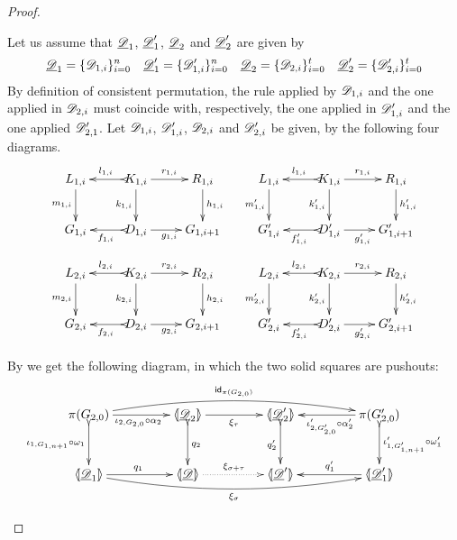 \begin{proof}
\begin{itemize}
Let us assume that $\underline{\mathscr{D}}_1$, $\underline{\mathscr{D}}'_1$, $\underline{\mathscr{D}}_2$ and $\underline{\mathscr{D}}'_2$ are given by
\[\underline{\mathscr{D}}_1=\{\mathscr{D}_{1,i}\}_{i=0}^n \quad \underline{\mathscr{D}}'_1=\{\mathscr{D}'_{1,i}\}_{i=0}^n \quad \underline{\mathscr{D}}_2=\{\mathscr{D}_{2,i}\}_{i=0}^t \quad \underline{\mathscr{D}}_2'=\{\mathscr{D}'_{2,i}\}_{i=0}^t\]
By definition of consistent permutation, the rule applied by $\mathscr{D}_{1,i}$ and the one applied in $\mathscr{D}_{2,i}$  must coincide with, respectively, the one applied in $\mathscr{D}'_{1,i}$ and the one applied $\mathscr{D}'_{2,1}$. Let $\mathscr{D}_{1,i}$, $\mathscr{D}'_{1,i}$, $\mathscr{D}_{2,i}$ and $\mathscr{D}'_{2,i}$ be given, by the following four diagrams. 
\[\xymatrix{L_{1,i} \ar[d]_{m_{1, i}}& K_{1,i} \ar[d]_{k_{1, i}} \ar[r]^{r_{1,i}} \ar@{>->}[l]_{l_{1,i}} & R_{1,i}\ar[d]^{h_{1, i}} &L_{1,i} \ar[d]_{m'_{1, i}}& K_{1,i} \ar[d]_{k'_{1, i}} \ar[r]^{r_{1,i}} \ar@{>->}[l]_{l_{1,i}} & R_{1,i}\ar[d]^{h'_{1, i}} \\G_{1,i} & D_{1,i} \ar[r]_{g_{1,i}} \ar@{>->}[l]^{f_{1,i}} & G_{1,i+1} & G'_{1,i} & D'_{1,i}\ar[r]_{g'_{1,i}} \ar@{>->}[l]^{f'_{1,i}}  & G'_{1,i+1}}\]		
\[\xymatrix{L_{2,i} \ar[d]_{m_{2, i}}& K_{2,i} \ar[d]_{k_{2, i}} \ar[r]^{r_{2,i}} \ar@{>->}[l]_{l_{2,i}} & R_{2,i}\ar[d]^{h_{2, i}} &L_{2,i} \ar[d]_{m'_{2, i}}& K_{2,i} \ar[d]_{k'_{2, i}} \ar[r]^{r_{2,i}} \ar@{>->}[l]_{l_{2,i}} & R_{2,i}\ar[d]^{h'_{2, i}} \\G_{2,i} & D_{2,i} \ar[r]_{g_{2,i}} \ar@{>->}[l]^{f_{2,i}} & G_{2,i+1} & G'_{2,i} & D'_{2,i}\ar[r]_{g'_{2,i}} \ar@{>->}[l]^{f'_{2,i}}  & G'_{2,i+1}}\] 

By  we get the following diagram, in which the two solid squares are pushouts:
\[\xymatrix@C=45pt@R=30pt{\pi(G_{2,0}) \ar@/^.4cm/[rrr]^{\id{\pi(G_{2,0})}}\ar@{>->}[d]_{\iota_{1, G_{1,n+1}} \circ \omega_1}\ar[r]_{\iota_{2, G_{2,0}} \circ \alpha_2}& \lpro \der{D}_2 \rpro \ar@{>->}[d]^{q_2}\ar[r]_{\xi_\tau} & \lpro \der{D}'_2 \rpro \ar@{>->}[d]_{q'_2} &\pi(G'_{2,0}) \ar@{>->}[d]^{\iota'_{1, G'_{1,n+1}} \circ \omega'_1} \ar[l]^{\iota'_{2, G'_{2,0}} \circ \alpha'_2}\\ \lpro \der{D}_1 \rpro \ar@/_.4cm/[rrr]_{\xi_\sigma} \ar[r]^{q_1} & \tpro{D} \ar@{.>}[r]^{\xi_{\sigma+\tau}} & \lpro \der{D}'\rpro & \lpro \der{D}'_1\rpro  \ar[l]_{q'_1}}\]


\end{itemize}
\end{proof}
